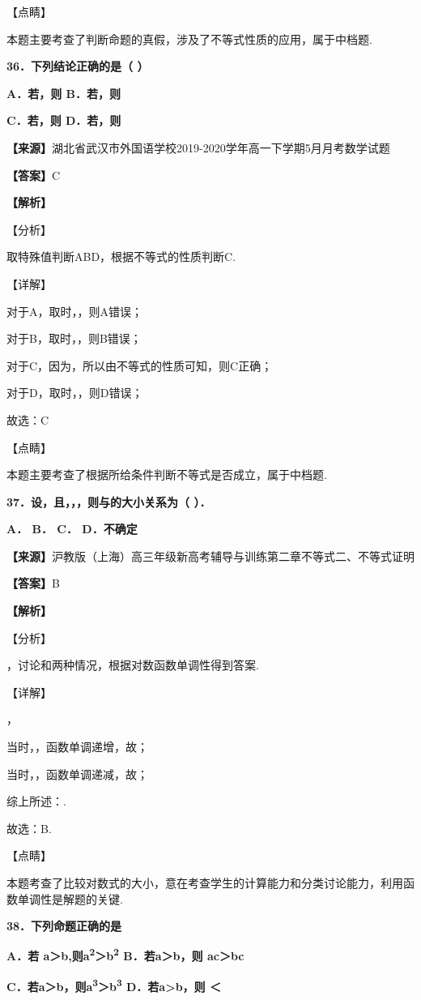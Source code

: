 【点睛】

本题主要考查了判断命题的真假，涉及了不等式性质的应用，属于中档题.

\textbf{36．下列结论正确的是（ ）}

\textbf{A．若，则 B．若，则}

\textbf{C．若，则 D．若，则}

\textbf{【来源】}湖北省武汉市外国语学校2019-2020学年高一下学期5月月考数学试题

\textbf{【答案】}C

\textbf{【解析】}

【分析】

取特殊值判断ABD，根据不等式的性质判断C.

【详解】

对于A，取时，，则A错误；

对于B，取时，，则B错误；

对于C，因为，所以由不等式的性质可知，则C正确；

对于D，取时，，则D错误；

故选：C

【点睛】

本题主要考查了根据所给条件判断不等式是否成立，属于中档题.

\textbf{37．设，且，，，则与的大小关系为（ ）．}

\textbf{A． B． C． D．不确定}

\textbf{【来源】}沪教版（上海）高三年级新高考辅导与训练第二章不等式二、不等式证明

\textbf{【答案】}B

\textbf{【解析】}

【分析】

，讨论和两种情况，根据对数函数单调性得到答案.

【详解】

，

当时，，函数单调递增，故；

当时，，函数单调递减，故；

综上所述：.

故选：B.

【点睛】

本题考查了比较对数式的大小，意在考查学生的计算能力和分类讨论能力，利用函数单调性是解题的关键.

\textbf{38．下列命题正确的是}

\textbf{A．若 a＞b,则a\textsuperscript{2}＞b\textsuperscript{2}
B．若a＞b，则 ac＞bc}

\textbf{C．若a＞b，则a\textsuperscript{3}＞b\textsuperscript{3}
D．若a\textgreater b，则 ＜}

